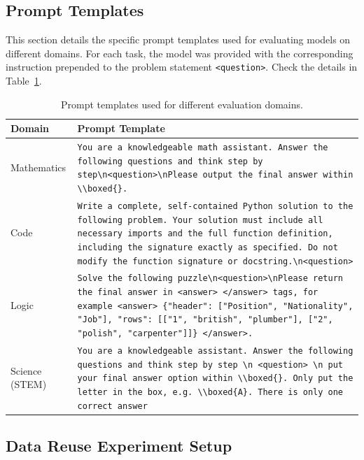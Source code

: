 \subsection{Prompt Templates}
\label{app:prompts}
This section details the specific prompt templates used for evaluating models on different domains. For each task, the model was provided with the corresponding instruction prepended to the problem statement \texttt{<question>}. Check the details in Table~\ref{tab:prompt_templates}.
\begin{table}[tb]
\centering
\begin{tabular}{>{\raggedright\arraybackslash}p{3cm} >{\raggedright\arraybackslash}p{\dimexpr\linewidth-3cm-2\tabcolsep\relax}}
\toprule
\textbf{Domain} & \textbf{Prompt Template} \\
\midrule
Mathematics & \texttt{You are a knowledgeable math assistant. Answer the following questions and think step by step\textbackslash{}n<question>\textbackslash{}nPlease output the final answer within \textbackslash{}\textbackslash{}boxed\{\}.} \\
\midrule
Code & \texttt{Write a complete, self-contained Python solution to the following problem. Your solution must include all necessary imports and the full function definition, including the signature exactly as specified. Do not modify the function signature or docstring.\textbackslash{}n<question>} \\
\midrule
Logic & \texttt{Solve the following puzzle\textbackslash{}n<question>\textbackslash{}nPlease return the final answer in <answer> </answer> tags, for example <answer> \{"header": ["Position", "Nationality", "Job"], "rows": [["1", "british", "plumber"], ["2", "polish", "carpenter"]]\} </answer>.}  \\
\midrule
Science (STEM) & \texttt{You are a knowledgeable assistant. Answer the following questions and think step by step \textbackslash{}n <question> \textbackslash{}n put your final answer option within \textbackslash{}\textbackslash{}boxed\{\}. Only put the letter in the box, e.g. \textbackslash{}\textbackslash{}boxed\{A\}. There is only one correct answer} \\
\midrule
\end{tabular}
\caption{Prompt templates used for different evaluation domains.}
\label{tab:prompt_templates}
\end{table}

\subsection{Data Reuse Experiment Setup}
\label{app:data-reuse-detailed}

